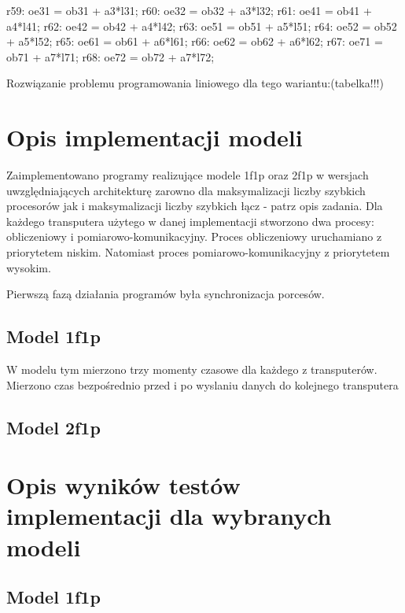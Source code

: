 \documentclass[a4paper,11pt, titlepage]{article}
\begin{document}
\begin{flushleft}
r59: oe31 = ob31 + a3*l31;\linebreak
r60: oe32 = ob32 + a3*l32;\linebreak
r61: oe41 = ob41 + a4*l41;\linebreak
r62: oe42 = ob42 + a4*l42;\linebreak
r63: oe51 = ob51 + a5*l51;\linebreak
r64: oe52 = ob52 + a5*l52;\linebreak
r65: oe61 = ob61 + a6*l61;\linebreak
r66: oe62 = ob62 + a6*l62;\linebreak
r67: oe71 = ob71 + a7*l71;\linebreak
r68: oe72 = ob72 + a7*l72;\linebreak
\end{flushleft}

Rozwiązanie problemu programowania liniowego dla tego wariantu:(tabelka!!!)

\section{Opis implementacji modeli}
Zaimplementowano programy realizujące modele 1f1p oraz 2f1p w wersjach uwzględniających architekturę zarowno dla maksymalizacji liczby szybkich procesorów jak i maksymalizacji liczby szybkich łącz - patrz opis zadania. Dla każdego transputera użytego w danej implementacji stworzono dwa procesy: obliczeniowy i pomiarowo-komunikacyjny. Proces obliczeniowy uruchamiano z priorytetem niskim. Natomiast proces pomiarowo-komunikacyjny z priorytetem wysokim.

Pierwszą fazą działania programów była synchronizacja porcesów.

\subsection{Model 1f1p}
W modelu tym mierzono trzy momenty czasowe dla każdego z transputerów. Mierzono czas bezpośrednio przed i po wyslaniu danych do kolejnego transputera
\subsection{Model 2f1p}
\section{Opis wyników testów implementacji dla wybranych modeli}
\subsection{Model 1f1p}
\end{document}
